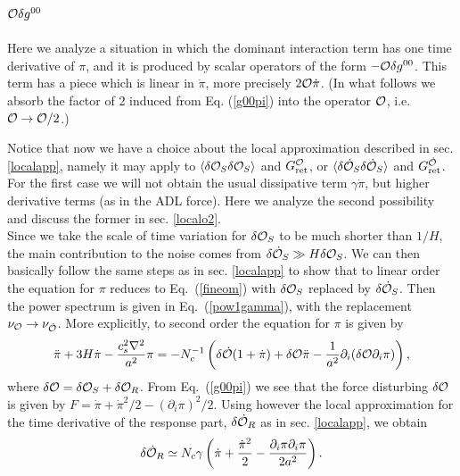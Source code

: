 \documentclass[11pt,amsmath,floats,floatfix,nofootinbib,secnumarabic, superscriptaddress, tightenlines]{revtex4}
\newcommand{\beq}{\begin{equation}}
\newcommand{\eeq}{\end{equation}}
\newcommand{\calo}{{\cal O}}
\begin{document}
{\subsection{$\calo \delta g^{00}$}\label{Nolocalo2}

Here we analyze a situation in which the dominant interaction term has one time derivative of $\pi$, and it is produced by scalar operators of the form $-\calo\delta g^{00}$. This term has a piece which is linear in $\dot\pi$, more precisely $2\calo \dot\pi$. (In what follows we absorb the factor of 2 induced from Eq. (\ref{g00pi}) into the operator $\calo$, i.e. $\calo \to \calo/2$.) 

Notice that now we have a choice about the local approximation described in sec. \ref{localapp}, namely it may apply to $\langle\delta{\calo}_S\delta{\calo}_S\rangle$ and $G^{\calo}_{\rm ret}$, or  $\langle\delta\dot{{\calo}}_S\delta\dot{{\calo}}_S\rangle$ and $G^{\dot{\calo}}_{\rm ret}$. For the first case we will not obtain the usual dissipative term $\gamma\dot\pi$, but higher derivative terms (as in the ADL force). Here we analyze the second possibility and discuss the former in sec. \ref{localo2}.\\

Since we take the scale of time variation for $\delta\calo_S$ to be much shorter than $1/H$, the main contribution to the noise comes from $\delta\dot{\calo}_S \gg H\delta\calo_S$. We can then basically follow the same steps as in sec. \ref{localapp} to show that to linear order the equation for $\pi$ reduces to
Eq.~(\ref{fineom}) with ${\delta\calo_S}$ replaced by $\delta\dot{\calo}_S$. Then the power spectrum is  given in Eq.~(\ref{pow1gamma}), with  the
replacement $\nu_{\calo}\to\nu_{\dot{\calo}}$. More explicitly, to second order the equation for $\pi$ is given by
\beq
\ddot\pi + 3H\dot\pi  - \frac{c_s^2\nabla^2}{a^2}\pi = -N^{-1}_c\left(\delta\dot{\calo} (1+\dot{\pi})+\delta\calo\ddot\pi -\frac{1}{a^2}\partial_i(\delta\calo\partial_i\pi)\right),\label{pieqnlprev}
\eeq where $\delta\calo=\delta\calo_S+\delta\calo_R$. From Eq.~(\ref{g00pi}) we see that the force disturbing $\delta \calo$ is given by
$F=\dot{\pi}+\dot{\pi}^2/2-(\partial_i\pi)^2/2$. Using however the local approximation for the time derivative of the response part, $\delta\dot{\calo}_R$ as in  sec. \ref{localapp}, we obtain
\beq
\label{ocaldot}
\delta\dot\calo_R\simeq N_c\gamma\left(\dot{\pi} +\frac{\dot{\pi}^2}{2}-\frac{\partial_i\pi\partial_i\pi}{2 a^2}\right).
\eeq

}
\end{document}
